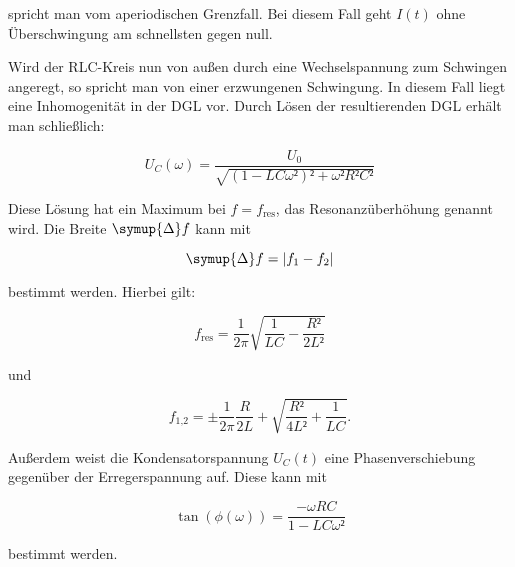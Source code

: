 spricht man vom aperiodischen Grenzfall. Bei diesem Fall geht $I(t)$ ohne 
Überschwingung am schnellsten gegen null. 

Wird der RLC-Kreis nun von außen durch eine Wechselspannung zum Schwingen 
angeregt, so spricht man von einer erzwungenen Schwingung. In diesem Fall
liegt eine Inhomogenität in der DGL vor. Durch Lösen der resultierenden 
DGL erhält man schließlich: 

\begin{equation}
U_C(\omega) = \frac{U_0}{\sqrt{(1-LC\omega²)²+\omega²R²C²}}
\end{equation}

Diese Lösung hat ein Maximum bei $f = f_\text{res}$, das Resonanzüberhöhung
genannt wird. Die Breite $\symup{\Delta}f$ kann mit

\begin{equation}
\symup{\Delta} f = |f_1 - f_2|
\end{equation}

bestimmt werden. Hierbei gilt: 

\begin{equation}
f_\text{res} = \frac{1}{2\pi}\sqrt{\frac{1}{LC}-\frac{R²}{2L²}}
\end{equation}

und 

\begin{equation}
f_\text{1,2} = \pm \frac{1}{2\pi} \frac{R}{2L}+\sqrt{\frac{R²}{4L²}+\frac{1}{LC}}.
\end{equation}

Außerdem weist die Kondensatorspannung $U_C(t)$ eine Phasenverschiebung gegenüber
der Erregerspannung auf. Diese kann mit 

\begin{equation}
\tan({\phi(\omega)})=\frac{-\omega RC}{1-LC\omega²}
\end{equation}

bestimmt werden. 